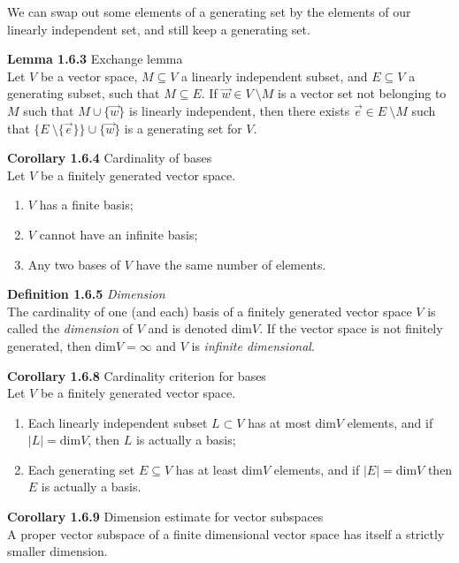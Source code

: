 \documentclass[8pt,landscape]{article}
\begin{document}
\begin{multicols}{3}
    We can swap out some elements of a generating set by the elements of our linearly
    independent set, and still keep a generating set.

    \textbf{Lemma 1.6.3} Exchange lemma \\
    Let $V$ be a vector space, $M \subseteq V$ a linearly independent subset,
    and $E \subseteq V$ a generating subset, such that $M \subseteq E$.
    If $\vec{w} \in V \ \setminus M$ is a vector set not belonging to $M$ such that
    $M \cup \{\vec{w}\}$ is linearly independent, then there exists
    $\vec{e} \in E \ \setminus M$ such that
    $\{E \ \setminus \{\vec{e}\}\} \cup \{\vec{w} \}$ is a generating set for $V$.

    \textbf{Corollary 1.6.4} Cardinality of bases \\
    Let $V$ be a finitely generated vector space.
    \begin{enumerate}
        \item $V$ has a finite basis;
        \item $V$ cannot have an infinite basis;
        \item Any two bases of $V$ have the same number of elements.
    \end{enumerate}

    \textbf{Definition 1.6.5} \emph{Dimension} \\
    The cardinality of one (and each) basis of a finitely generated vector space $V$
    is called the \emph{dimension} of $V$ and is denoted $\text{dim}V$.
    If the vector space is not finitely generated, then $\text{dim}V = \infty$
    and $V$ is \emph{infinite dimensional}.

    \textbf{Corollary 1.6.8} Cardinality criterion for bases \\
    Let $V$ be a finitely generated vector space.
    \begin{enumerate}
        \item Each linearly independent subset $L \subset V$ has at most dim$V$
            elements,
            and if $|L| = \text{dim}V$, then $L$ is actually a basis;
        \item Each generating set $E \subseteq V$ has at least dim$V$ elements,
            and if $|E| = \text{dim}V$ then $E$ is actually a basis.
    \end{enumerate}

    \textbf{Corollary 1.6.9} Dimension estimate for vector subspaces \\
    A proper vector subspace of a finite dimensional vector space has itself a strictly
    smaller dimension.


\end{multicols}
\end{document}
